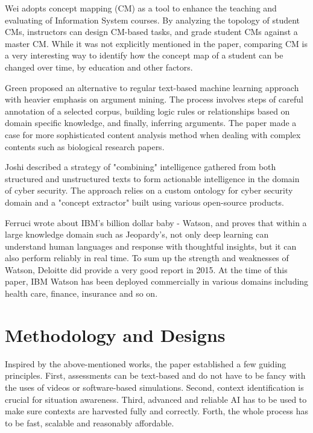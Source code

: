 \documentclass[conference]{IEEEtran}
\begin{document}
Wei \cite{Wei2017IntegratingAssessment} adopts concept mapping (CM) as a tool to enhance the teaching and evaluating of Information System courses. By analyzing the topology of student CMs, instructors can design CM-based tasks, and grade student CMs against a master CM. While it was not explicitly mentioned in the paper, comparing CM is a very interesting way to identify how the concept map of a student can be changed over time, by education and other factors.

Green \cite{Green2018TowardsSchemes} proposed an alternative to regular text-based machine learning approach with heavier emphasis on argument mining. The process involves steps of careful annotation of a selected corpus, building logic rules or relationships based on domain specific knowledge, and finally, inferring arguments. The paper made a case for more sophisticated content analysis method when dealing with complex contents such as biological research papers.

Joshi \cite{Joshi2013ExtractingText} described a strategy of "combining" intelligence gathered from both structured and unstructured texts to form actionable intelligence in the domain of cyber security. The approach relies on a custom ontology for cyber security domain and a "concept extractor" built using various open-source products.

Ferruci \cite{Ferrucci2010BuildingProject} wrote about IBM's billion dollar baby - Watson, and proves that within a large knowledge domain such as Jeopardy's, not only deep learning can understand human languages and response with thoughtful insights, but it can also perform reliably in real time. To sum up the strength and weaknesses of Watson, Deloitte did provide a very good report \cite{DeloitteDevelopment2015DisruptionWatson} in 2015. At the time of this paper, IBM Watson has been deployed commercially in various domains including health care, finance, insurance and so on.

\section{Methodology and Designs}
Inspired by the above-mentioned works, the paper established a few guiding principles. First, assessments can be text-based and do not have to be fancy with the uses of videos or software-based simulations. Second, context identification is crucial for situation awareness. Third, advanced and reliable AI has to be used to make sure contexts are harvested fully and correctly. Forth, the whole process has to be fast, scalable and reasonably affordable.
\end{document}
